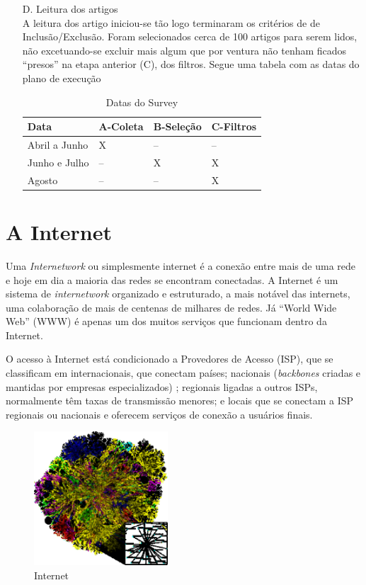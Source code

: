 \documentclass[conference,compsoc]{IEEEtran}
\begin{document}
\begin{enumerate}
  \item[D.] Leitura dos artigos \\
  A leitura dos artigo iniciou-se tão logo terminaram os critérios de de Inclusão/Exclusão.
  Foram selecionados cerca de 100 artigos para serem lidos, não excetuando-se excluir mais algum que por ventura não 
  tenham ficados ``presos'' na etapa anterior (C), dos filtros.
  Segue uma tabela com as datas do plano de execução
  
  \begin{table}[htbp]
  \scriptsize
  \centering
  \caption{Datas do Survey}
  \begin{tabular}{|p{18mm}|p{8mm}|p{8mm}|p{8mm}|}
  \hline
  Data & A-Coleta & B-Seleção & C-Filtros \\
  \hline
  Abril a Junho & X & -- & -- \\ \hline
  Junho e Julho & -- & X & X \\ \hline
  Agosto & -- & -- & X \\ \hline

  \end{tabular}
  \end{table}


\end{enumerate}

\section{A Internet}

Uma \textit{Internetwork} ou simplesmente internet é a conexão entre mais de uma rede e hoje em dia a maioria das redes se encontram conectadas.  A Internet é um sistema de \textit{internetwork} organizado e estruturado, a mais notável das internets, uma colaboração de mais de centenas de milhares de redes. Já ``World Wide Web'' (WWW) é apenas um dos muitos serviços que funcionam dentro da Internet. 

O acesso à Internet está condicionado a Provedores de Acesso (ISP), que se classificam em internacionais, que conectam países; nacionais (\textit{backbones} criadas e mantidas por empresas especializados) ; regionais ligadas a outros ISPs, normalmente têm taxas de transmissão menores; e locais que se conectam a ISP regionais ou nacionais e oferecem serviços de conexão a usuários finais.


\begin{figure}[!h]
\centering
\caption{Internet}
\includegraphics[width=50mm]{Figuras/internet_map.eps}
\end{figure}
\end{document}

